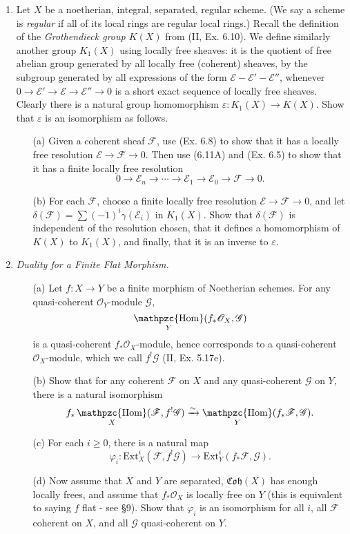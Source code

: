 \documentclass{article}
\newcommand{\goth}[1]{\mathfrak{#1}}
\newcommand{\fF}{\mathscr{F}}
\newcommand{\fG}{\mathscr{G}}
\newcommand{\fE}{\mathscr{E}}
\newcommand{\fO}{\mathscr{O}}
\DeclareMathOperator{\rHom}{\mathpzc{Hom}}
\begin{document}
\begin{enumerate} [label=\textbf{\arabic*.}, leftmargin=0em]
\item Let $X$ be a noetherian, integral, separated, regular scheme. (We say a scheme is \textit{regular} if all of its local rings are regular local rings.) Recall the definition of the \textit{Grothendieck group $K(X)$} from (II, Ex. 6.10). We define similarly another group $K_1(X)$ using locally free sheaves: it is the quotient of free abelian group generated by all locally free (coherent) sheaves, by the subgroup generated by all expressions of the form $\fE - \fE' - \fE''$, whenever $0 \to \fE' \to \fE \to \fE'' \to 0$ is a short exact sequence of locally free sheaves. Clearly there is a natural group homomorphism $\varepsilon : K_1(X) \to K(X)$. Show that $\varepsilon$ is an isomorphism as follows.
\begin{itemize}
  \item[(a)] Given a coherent sheaf $\fF$, use (Ex. 6.8) to show that it has a locally free resolution $\fE \to \fF \to 0$. Then use (6.11A) and (Ex. 6.5) to show that it has a finite locally free resolution
  \begin{equation*}
    0 \to \mathscr{E}_n \to \cdots \to \fE_1 \to \fE_0 \to \fF \to 0.
  \end{equation*}
  \item[(b)] For each $\fF$, choose a finite locally free resolution $\fE \to \fF \to 0$, and let $\delta(\fF) = \sum (-1)^i \gamma(\fE_i)$ in $K_1(X)$. Show that $\delta(\fF)$ is independent of the resolution chosen, that it defines a homomorphism of $K(X)$ to $K_1(X)$, and finally, that it is an inverse to $\varepsilon$.
\end{itemize}

\item \textit{Duality for a Finite Flat Morphism.}
\begin{itemize}
  \item[(a)] Let $f : X \to Y$ be a finite morphism of Noetherian schemes. For any quasi-coherent $\fO_Y$-module $\fG$, $$\rHom_Y(f_*\fO_X, \fG)$$ is a quasi-coherent $f_*\fO_X$-module, hence corresponds to a quasi-coherent $\fO_X$-module, which we call $f^!\fG$ (II, Ex. 5.17e).
  \item[(b)] Show that for any coherent $\fF$ on $X$ and any quasi-coherent $\fG$ on $Y$, there is a natural isomorphism
  \begin{equation*}
    f_*\rHom_X(\fF, f^!\fG) \xrightarrow{\sim} \rHom_Y(f_* \fF, \fG).
  \end{equation*}
  \item[(c)] For each $i \geq 0$, there is a natural map
  \begin{equation*}
    \varphi_i : \text{Ext}_X^i(\fF, f^!\fG) \to \text{Ext}_Y^i(f_* \fF, \fG).
  \end{equation*}
  \item[(d)] Now assume that $X$ and $Y$ are separated, $\goth{Coh}(X)$ has enough locally frees, and assume that $f_*\fO_X$ is locally free on $Y$ (this is equivalent to saying $f$ flat - see \S 9). Show that $\varphi_i$ is an isomorphism for all $i$, all $\fF$ coherent on $X$, and all $\fG$ quasi-coherent on $Y$.
\end{itemize}

\end{enumerate}
\end{document}
